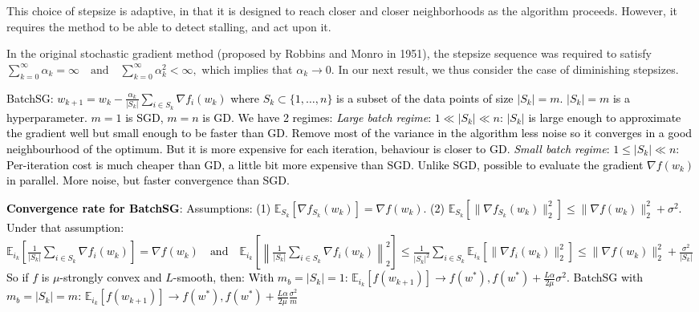\documentclass[a4paper,6pt]{extarticle}
\newcommand{\mybox}[2]{
    \begin{tcolorbox}[colback=color!5!white, colframe=color!75!black, boxsep=2pt, top=1pt, bottom=1pt, left=2pt, right=2pt, arc=3pt, outer arc=3pt, title={\textbf{#1}}]
    {\fontsize{5pt}{5pt}\selectfont \textcolor{black}{#2}}
    \end{tcolorbox}
}
\begin{document}
\begin{multicols}{2}
{This choice of stepsize is adaptive, in that it is designed to reach closer and closer neighborhoods as the algorithm proceeds. However, it requires the method to be able to detect stalling, and act upon it.

In the original stochastic gradient method (proposed by Robbins and Monro in 1951), the stepsize sequence was required to satisfy $\sum_{k=0}^{\infty} \alpha_k = \infty \quad \text{and} \quad \sum_{k=0}^{\infty} \alpha_k^2 < \infty,$
which implies that \(\alpha_k \to 0\). In our next result, we thus consider the case of diminishing stepsizes.
}

\mybox{Batch Stochastic Gradient}{

BatchSG: $w_{k+1} = w_k - \frac{\alpha_k}{|S_k|} \sum_{i \in S_k} \nabla f_i(w_k)$ where $S_k \subset \{1, \dots, n\}$ is a subset of the data points of size $|S_k| = m$. $|S_k| = m$ is a hyperparameter. $m = 1$ is SGD, $m = n$ is GD.
We have 2 regimes: \textit{Large batch regime}: $1 \ll |S_k| \ll n$: $|S_k|$ is large enough to approximate the gradient well but small enough to be faster than GD. Remove most of the variance in the algorithm less noise so it converges in a good neighbourhood of the optimum. But it is more expensive for each iteration, behaviour is closer to GD. \textit{Small batch regime}: $1 \leq |S_k| \ll n$: Per-iteration cost is much cheaper than GD, a little bit more expensive than SGD. Unlike SGD, possible to evaluate the gradient $\nabla f(w_k)$ in parallel. More noise, but faster convergence than SGD.

\textbf{Convergence rate for BatchSG}:
Assumptions: (1) $\mathbb{E}_{S_k} \left[ \nabla f_{S_k}(w_k) \right] = \nabla f(w_k)$. (2) $\mathbb{E}_{S_k} \left[ \| \nabla f_{S_k}(w_k) \|_2^2 \right] \leq \| \nabla f(w_k) \|_2^2 + \sigma^2$. Under that assumption:
$
\mathbb{E}_{i_k} \left[ \frac{1}{|S_k|} \sum_{i \in S_k} \nabla f_i(w_k) \right] = \nabla f(w_k) \quad \text{and} \quad \mathbb{E}_{i_k} \left[ \left\| \frac{1}{|S_k|} \sum_{i \in S_k} \nabla f_i(w_k) \right\|_2^2 \right] \leq \frac{1}{|S_k|^2} \sum_{i \in S_k} \mathbb{E}_{i_k} \left[ \| \nabla f_i(w_k) \|_2^2 \right] \leq \| \nabla f(w_k) \|_2^2 + \frac{\sigma^2}{|S_k|}
$
So if $f$ is $\mu$-strongly convex and $L$-smooth, then:
With $m_b = |S_k| = 1$:
$
\mathbb{E}_{i_k}[f(w_{k+1})] \to f(w^*), f(w^*) + \frac{L \alpha}{2 \mu} \sigma^2.
$
BatchSG with $m_b = |S_k| = m$:
$
\mathbb{E}_{i_k}[f(w_{k+1})] \to f(w^*), f(w^*) + \frac{L \alpha}{2 \mu} \frac{\sigma^2}{m}
$
}
\end{multicols}
\end{document}
